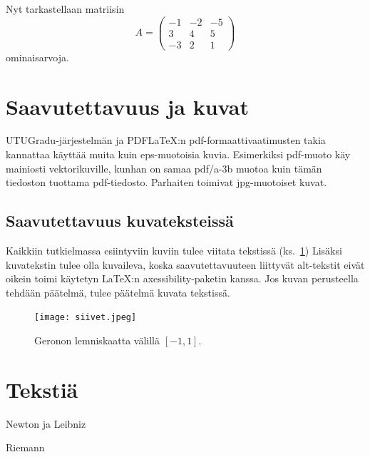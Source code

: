 Nyt tarkastellaan matriisin
\[
A=\left(\begin{array}{rrr} -1 & -2 & -5\\ 3& 4& 5\\ -3 & 2 & 1 \end{array}\right)
\]
ominaisarvoja.

\section{Saavutettavuus ja kuvat}

UTUGradu-järjestelmän ja PDF\LaTeX :n pdf-formaattivaatimusten takia kannattaa käyttää muita kuin eps-muotoisia kuvia. Esimerkiksi pdf-muoto käy mainiosti vektorikuville, kunhan on samaa pdf/a-3b muotoa kuin tämän tiedoston tuottama pdf-tiedosto. Parhaiten toimivat jpg-muotoiset kuvat.



\subsection{Saavutettavuus kuvateksteissä}

Kaikkiin tutkielmassa esiintyviin kuviin tulee viitata tekstissä (ks.~\ref{kuvatus1}) Lisäksi kuvatekstin tulee olla kuvaileva, koska saavutettavuuteen liittyvät alt-tekstit eivät oikein toimi käytetyn \LaTeX :n axessibility-paketin kanssa. Jos kuvan perusteella tehdään päätelmä, tulee päätelmä kuvata tekstissä. 

\begin{figure}[!h]
\begin{center}
\texttt{[image: siivet.jpeg]}
\end{center}
\label{kuvatus1}
\caption{Geronon lemniskaatta välillä $[-1,1]$.}
\end{figure}

\section{Tekstiä}

\lipsum[1-10]


 
\begin{thebibliography}{99}

 Newton ja Leibniz

 Riemann

\end{thebibliography}
